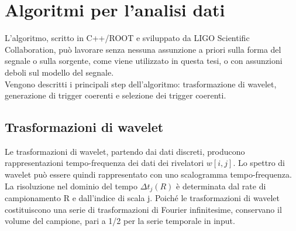 \section{Algoritmi per l'analisi dati}
L'algoritmo, scritto in C++/ROOT e sviluppato da LIGO Scientific Collaboration, può lavorare senza nessuna assunzione a priori sulla forma del segnale o sulla sorgente, come viene utilizzato in questa tesi, o con assunzioni deboli sul modello del segnale.\\
Vengono descritti i principali step dell'algoritmo: trasformazione di wavelet, generazione di trigger coerenti e selezione dei trigger coerenti.
\subsection{Trasformazioni di wavelet}
\label{subsection:wavelet_transform}
Le trasformazioni di wavelet, partendo dai dati discreti, producono rappresentazioni tempo-frequenza dei dati dei rivelatori $w[i,j]$. Lo spettro di wavelet può essere quindi rappresentato con uno scalogramma tempo-frequenza. La risoluzione nel dominio del tempo $\Delta t_j(R)$ è determinata dal rate di campionamento R e dall'indice di scala j. Poiché le trasformazioni di wavelet costituiscono una serie di trasformazioni di Fourier infinitesime, conservano il volume del campione, pari a 1/2 per la serie temporale in input.

